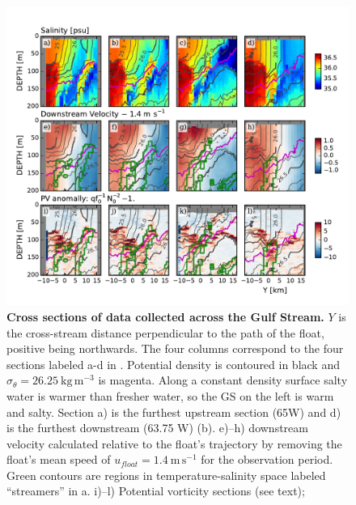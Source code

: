 \documentclass{natureJMK}
\begin{document}
\begin{figure}[htbp]
  \centering
    \includegraphics[width=\textwidth]{./SalDFirstStreamer.pdf}
    \caption{{\bf Cross sections of data collected across the Gulf Stream.}   $Y$ is the cross-stream distance perpendicular to the path of the float, positive being northwards.  The four columns correspond to the  four sections labeled a-d in . Potential density is contoured in black and $\sigma_{\theta}=26.25\ \mathrm{kg\,m^{-3}}$ is magenta.  Along a constant density surface salty water is warmer than fresher water, so the GS on the left is warm and salty.  Section a) is the furthest upstream section (65W) and d) is the furthest downstream (63.75 W) (b).  e)--h) downstream velocity calculated relative to the float's trajectory by removing the float's mean speed of $u_{float}=1.4\ \mathrm{m\,s^{-1}}$ for the observation period.   Green contours are regions in temperature-salinity space labeled ``streamers'' in a.  i)--l) Potential vorticity sections (see text);
 } \label{fig:SalDFirstStreamer}
\end{figure}
\end{document}
